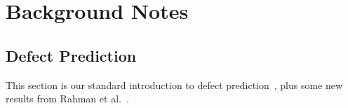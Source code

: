 \documentclass{sig-alternative}
\newcommand{\fig}[1]{Figure~\ref{fig:#1}}
\begin{document}
 






 



\section{Background Notes}
 

\subsection{Defect Prediction}


This section is our standard introduction to defect prediction~\cite{me15:book1},
plus    some new results from Rahman et al.~\cite{rahman14:icse}. 
 





 
\end{document}

